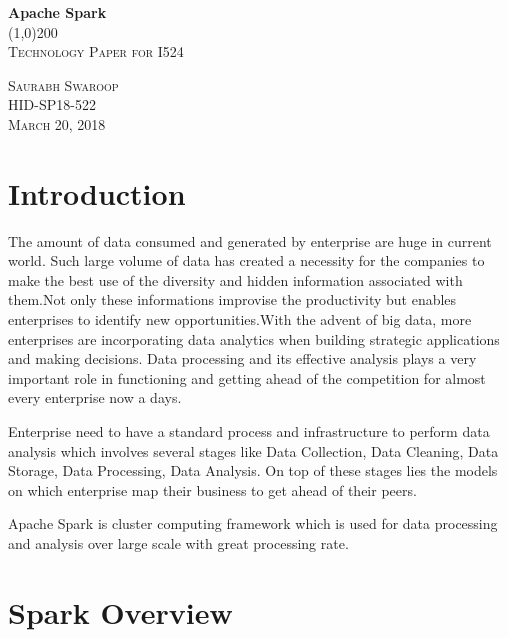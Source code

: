 \documentclass{paper}
\begin{document}
\begin{titlepage}
	\begin{center}
		\huge{\bfseries Apache Spark} \\
		\line(1,0){200} \\
		[1.5cm]
		\textsc{\LARGE Technology Paper for I524}\\
		[14cm]
	\end{center}
	\begin{flushright}
	\textsc{\large Saurabh Swaroop \\
	HID-SP18-522 \\
	March 20, 2018 \\}
	\end{flushright}

\end{titlepage}

\tableofcontents

\thispagestyle{empty}
\cleardoublepage

\setcounter{page}{1}

\section{Introduction}\label{sec:intro}
The amount of data consumed and generated by enterprise are huge in current world. Such large volume of data has created a necessity for the companies to make the best use of the diversity and hidden information associated with them.Not only these informations improvise the productivity but enables enterprises to identify new opportunities.With the advent of big data, more enterprises are incorporating data analytics when building strategic applications and making decisions. Data processing and its effective analysis plays a very important role in functioning and getting ahead of the competition for almost every enterprise now a days. \hfill\break


Enterprise need to have a standard process and infrastructure to perform data analysis which involves
several stages like Data Collection, Data Cleaning, Data Storage, Data Processing, Data Analysis. On top of these stages lies the models on which enterprise map their business to get ahead of their peers.\hfill\break

Apache Spark is cluster computing framework which is used for data processing and analysis over large scale with great processing rate.

\newpage
\section{Spark Overview}
\end{document}
